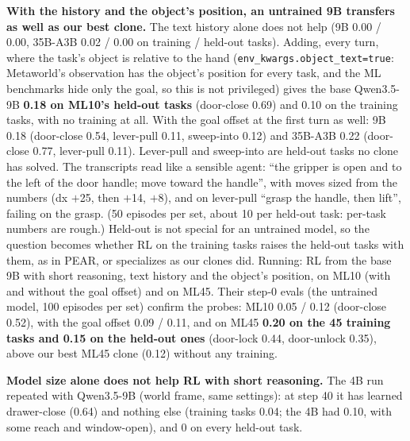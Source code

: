 \documentclass[11pt]{article}
\newcommand{\code}[1]{\texttt{#1}}
\begin{document}
\textbf{With the history and the object's position, an untrained 9B transfers as well as our best clone.} The text
history alone does not help (9B 0.00 / 0.00, 35B-A3B 0.02 / 0.00 on training / held-out tasks). Adding, every turn,
where the task's object is relative to the hand (\code{env\_kwargs.object\_text=true}: Metaworld's observation has the
object's position for every task, and the ML benchmarks hide only the goal, so this is not privileged) gives the base
Qwen3.5-9B \textbf{0.18 on ML10's held-out tasks} (door-close 0.69) and 0.10 on the training tasks, with no training at
all. With the goal offset at the first turn as well: 9B 0.18 (door-close 0.54, lever-pull 0.11, sweep-into 0.12) and
35B-A3B 0.22 (door-close 0.77, lever-pull 0.11). Lever-pull and sweep-into are held-out tasks no clone has solved. The
transcripts read like a sensible agent: ``the gripper is open and to the left of the door handle; move toward the
handle'', with moves sized from the numbers (dx $+$25, then $+$14, $+$8), and on lever-pull ``grasp the handle, then
lift'', failing on the grasp. (50 episodes per set, about 10 per held-out task: per-task numbers are rough.) Held-out
is not special for an untrained model, so the question becomes whether RL on the training tasks raises the held-out
tasks with them, as in PEAR, or specializes as our clones did. Running: RL from the base 9B with short reasoning,
text history and the object's position, on ML10 (with and without the goal offset) and on ML45. Their step-0 evals
(the untrained model, 100 episodes per set) confirm the probes: ML10 0.05 / 0.12 (door-close 0.52), with the goal offset
0.09 / 0.11, and on ML45 \textbf{0.20 on the 45 training tasks and 0.15 on the held-out ones} (door-lock 0.44,
door-unlock 0.35), above our best ML45 clone (0.12) without any training.

\begin{table}[h]
\centering\small

\caption{Zero-shot probes of base models on ML10 (no training; 50 training-task and 50 held-out episodes each).
Reasoning: native thinking (8192 tokens, temperature 0.6) or a short reason before each move (256 tokens, greedy).
Axes: Metaworld's world axes or camera-aligned. Notes: the scene's conventions stated. History: earlier turns' text in
context. Object / goal: the task's object (every turn) / the goal (first turn) relative to the hand. Unfinished: replies
without a readable move on training tasks.}
\label{tab:probes}
\end{table}

\textbf{Model size alone does not help RL with short reasoning.} The 4B run repeated with Qwen3.5-9B (world frame, same
settings): at step 40 it has learned drawer-close (0.64) and nothing else (training tasks 0.04; the 4B had 0.10, with
some reach and window-open), and 0 on every held-out task.
\end{document}
